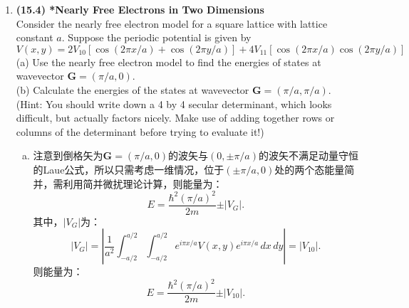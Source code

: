 \documentclass[reqno,a4paper,12pt]{amsart}
\begin{document}
\begin{enumerate}[1.]
\item \textbf{(15.4) *Nearly Free Electrons in Two Dimensions} \\
Consider the nearly free electron model for a square lattice with lattice constant $a$. Suppose the periodic potential is given by 
\[
	V(x,y) = 2V_{10}[\cos(2\pi x/a) + \cos(2\pi y/a)] + 4V_{11}[\cos(2\pi x/a)\cos(2\pi y/a)]
\]
(a) Use the nearly free electron model to find the energies of states at wavevector $\mathbf{G} = (\pi/a,0)$. \\
(b) Calculate the energies of the states at wavevector $\mathbf{G} = (\pi/a,\pi/a)$. (Hint: You should write down a 4 by 4 secular determinant, which looks difficult, but actually factors nicely. Make use of adding together rows or columns of the determinant before trying to evaluate it!)
\begin{tcolorbox}[breakable, colback = black!5!white, colframe = black]
\begin{enumerate}[(a)]
\item 注意到倒格矢为$\mathbf{G} = (\pi/a,0)$的波矢与$(0,\pm \pi/a)$的波矢不满足动量守恒的Laue公式，所以只需考虑一维情况，位于$(\pm \pi/a, 0)$处的两个态能量简并，需利用简并微扰理论计算，则能量为：
\[
	E = \frac{\hbar^2(\pi/a)^2}{2m} \pm \vert V_G \vert.
\]
其中，$\vert V_G \vert$为：
\[
	\vert V_G \vert = \left\vert \frac{1}{a^2} \int_{-a/2}^{a/2}\int_{-a/2}^{a/2} e^{i\pi x/a} V(x,y) e^{i\pi x/a} \,dx\,dy \right\vert = \vert V_{10} \vert.
\]
则能量为：
\[
	E = \frac{\hbar^2(\pi/a)^2}{2m} \pm \vert V_{10} \vert.
\]


\end{enumerate}
\end{tcolorbox}
\end{enumerate}
\end{document}
